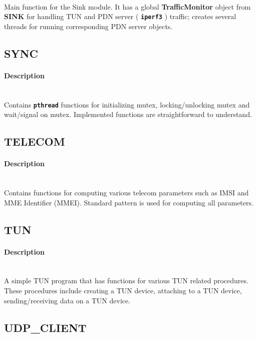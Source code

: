 \documentclass[hidelinks]{report}
\newcommand{\cf}[1] {
	\textbf{\texttt{#1}}
}
\begin{document}
~\\ Main function for the Sink module. It has a global \textbf{TrafficMonitor} object from \textbf{SINK} for handling TUN and PDN server (\cf{iperf3}) traffic; creates several threads for running corresponding PDN server objects.

\subsection*{SYNC}

\paragraph*{Description}

~\\ Contains \cf{pthread} functions for initializing mutex, locking/unlocking mutex and wait/signal on mutex. Implemented functions are straightforward to understand.

\subsection*{TELECOM}

\paragraph*{Description}

~\\ Contains functions for computing various telecom parameters such as IMSI and MME Identifier (MMEI). Standard pattern is used for computing all parameters.

\subsection*{TUN}

\paragraph*{Description}

~\\ A simple TUN program that has functions for various TUN related procedures. These procedures include creating a TUN device, attaching to a TUN device, sending/receiving data on a TUN device.

\subsection*{UDP\_CLIENT}
\end{document}
